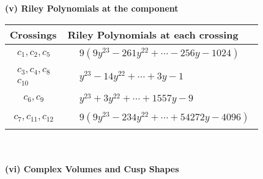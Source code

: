 \documentclass[1p]{elsarticle_modified}
\theoremstyle{definition}
\begin{document}
\newpage\renewcommand{\arraystretch}{1}
\flushleft \textbf{(v) Riley Polynomials at the component}\newline \\
\begin{tabular}{m{50pt}|m{274pt}}
Crossings & \hspace{64pt}Riley Polynomials at each crossing \\
\hline $$\begin{aligned}c_{1},c_{2},c_{5}\end{aligned}$$&$\begin{aligned}
&9(9 y^{23}-261 y^{22}+\cdots-256 y-1024)
\end{aligned}$\\
\hline $$\begin{aligned}c_{3},c_{4},c_{8}\\c_{10}\end{aligned}$$&$\begin{aligned}
&y^{23}-14 y^{22}+\cdots+3 y-1
\end{aligned}$\\
\hline $$\begin{aligned}c_{6},c_{9}\end{aligned}$$&$\begin{aligned}
&y^{23}+3 y^{22}+\cdots+1557 y-9
\end{aligned}$\\
\hline $$\begin{aligned}c_{7},c_{11},c_{12}\end{aligned}$$&$\begin{aligned}
&9(9 y^{23}-234 y^{22}+\cdots+54272 y-4096)
\end{aligned}$\\
\hline
\end{tabular}\\~\\
\newpage\flushleft \textbf{(vi) Complex Volumes and Cusp Shapes}
\end{document}
